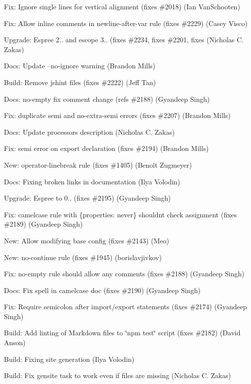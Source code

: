 \begin{DoxyItemize}
\item Fix\+: Ignore single lines for vertical alignment (fixes \#2018) (Ian Van\+Schooten)
\item Fix\+: Allow inline comments in newline-\/after-\/var rule (fixes \#2229) (Casey Visco)
\item Upgrade\+: Espree 2.. and escope 3.. (fixes \#2234, fixes \#2201, fixes (Nicholas C. Zakas)
\item Docs\+: Update --no-\/ignore warning (Brandon Mills)
\item Build\+: Remove jshint files (fixes \#2222) (Jeff Tan)
\item Docs\+: no-\/empty fix comment change (refs \#2188) (Gyandeep Singh)
\item Fix\+: duplicate semi and no-\/extra-\/semi errors (fixes \#2207) (Brandon Mills)
\item Docs\+: Update processors description (Nicholas C. Zakas)
\item Fix\+: semi error on export declaration (fixes \#2194) (Brandon Mills)
\item New\+: operator-\/linebreak rule (fixes \#1405) (Benoît Zugmeyer)
\item Docs\+: Fixing broken links in documentation (Ilya Volodin)
\item Upgrade\+: Espree to 0.. (fixes \#2195) (Gyandeep Singh)
\item Fix\+: camelcase rule with \{properties\+: never\} shouldn\textquotesingle{}t check assignment (fixes \#2189) (Gyandeep Singh)
\item New\+: Allow modifying base config (fixes \#2143) (Meo)
\item New\+: no-\/continue rule (fixes \#1945) (borislavjivkov)
\item Fix\+: {\ttfamily no-\/empty} rule should allow any comments (fixes \#2188) (Gyandeep Singh)
\item Docs\+: Fix spell in camelcase doc (fixes \#2190) (Gyandeep Singh)
\item Fix\+: Require semicolon after import/export statements (fixes \#2174) (Gyandeep Singh)
\item Build\+: Add linting of Markdown files to \char`\"{}npm test\char`\"{} script (fixes \#2182) (David Anson)
\item Build\+: Fixing site generation (Ilya Volodin)
\item Build\+: Fix gensite task to work even if files are missing (Nicholas C. Zakas)
\end{DoxyItemize}

